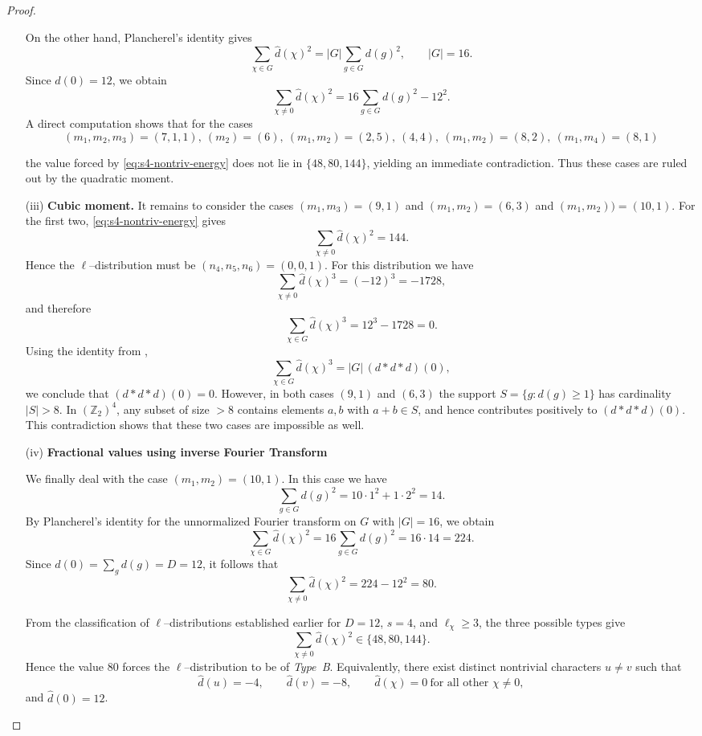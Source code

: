 \documentclass[10pt,a4paper]{amsart}
\begin{document}
\begin{proof}
\begin{enumerate}
On the other hand, Plancherel's identity gives
\[
\sum_{\chi\in G}\widehat d(\chi)^2
=
|G|\sum_{g\in G} d(g)^2,
\qquad |G|=16.
\]
Since $\widehat d(0)=12$, we obtain
\begin{equation}\label{eq:s4-nontriv-energy}
\sum_{\chi\neq 0}\widehat d(\chi)^2
=
16\sum_{g\in G} d(g)^2 - 12^2.
\end{equation}
A direct computation shows that for the cases
\[
(m_1,m_2,m_3) = (7,1,1),\ (m_2) = (6),\ (m_1,m_2) = (2,5),\ (4,4),\ (m_1, m_2) = (8,2),\ (m_1, m_4) = (8,1)
\]

the value forced by \eqref{eq:s4-nontriv-energy} does not lie in
$\{48,80,144\}$, yielding an immediate contradiction. Thus these cases are
ruled out by the quadratic moment.

\item[(iii)] \textbf{Cubic moment.}
It remains to consider the cases $(m_1,m_3)=(9,1)$ and $(m_1,m_2)=(6,3)$ and $(m_1, m_2)) = (10, 1)$. For the first two, \eqref{eq:s4-nontriv-energy} gives
\[
\sum_{\chi\neq 0}\widehat d(\chi)^2=144.
\]
Hence the $\ell$--distribution must be $(n_4,n_5,n_6)=(0,0,1)$.
For this distribution we have
\[
\sum_{\chi\neq 0}\widehat d(\chi)^3 = (-12)^3=-1728,
\]
and therefore
\[
\sum_{\chi\in G}\widehat d(\chi)^3
=
12^3-1728=0.
\]
Using the identity from ,
\[
\sum_{\chi\in G}\widehat d(\chi)^3
=
|G|\,(d*d*d)(0),
\]
we conclude that $(d*d*d)(0)=0$. However, in both cases $(9,1)$ and $(6,3)$ the support $S=\{g:d(g)\ge 1\}$ has cardinality $|S|>8$. In $(\mathbb Z_2)^4$, any subset of size $>8$ contains elements $a,b$ with $a+b\in S$, and hence contributes positively to
$(d*d*d)(0)$. This contradiction shows that these two cases are impossible as
well.

\item[(iv)] \textbf{Fractional values using inverse Fourier Transform}

\medskip
We finally deal with the case $(m_1,m_2)=(10,1)$.
In this case we have
\[
\sum_{g\in G} d(g)^2 = 10\cdot 1^2 + 1\cdot 2^2 = 14.
\]
By Plancherel's identity for the unnormalized Fourier transform on $G$ with
$|G|=16$, we obtain
\[
\sum_{\chi\in G}\widehat d(\chi)^2
=
16\sum_{g\in G} d(g)^2
=
16\cdot 14
=
224.
\]
Since $\widehat d(0)=\sum_g d(g)=D=12$, it follows that
\[
\sum_{\chi\neq 0}\widehat d(\chi)^2
=
224-12^2
=
80.
\]

From the classification of $\ell$--distributions established earlier for
$D=12$, $s=4$, and $\ell_\chi\ge 3$, the three possible types give
\[
\sum_{\chi\neq 0}\widehat d(\chi)^2\in\{48,80,144\}.
\]
Hence the value $80$ forces the $\ell$--distribution to be of \emph{Type~B}.
Equivalently, there exist distinct nontrivial characters $u\neq v$ such that
\[
\widehat d(u)=-4,\qquad
\widehat d(v)=-8,\qquad
\widehat d(\chi)=0\ \text{for all other }\chi\neq 0,
\]
and $\widehat d(0)=12$.


\end{enumerate}
\end{proof}
\end{document}
